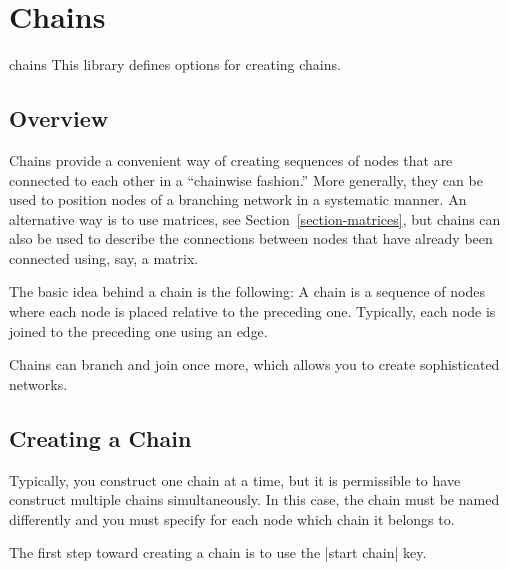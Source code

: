 %
%
%


\section{Chains}

\label{section-chains}

\begin{tikzlibrary}{chains}
  This library defines options for creating chains.
\end{tikzlibrary}


\subsection{Overview}

Chains provide a convenient way of creating sequences of nodes that
are connected to each other in a ``chainwise fashion.'' More
generally, they can be used to position nodes of a branching network
in a systematic manner. An alternative way is to use matrices, see
Section~\ref{section-matrices}, but chains can also be used 
to describe the connections between nodes that have already been
connected using, say, a matrix. 

The basic idea behind a chain is the following: A chain is a
sequence of nodes where each node is placed relative to the
preceding one. Typically, each node is joined to the preceding one
using an edge.

Chains can branch and join once more, which allows you to create
sophisticated networks.


\subsection{Creating a Chain}

Typically, you construct one chain at a time, but it is
permissible to have construct multiple chains simultaneously. In this
case, the chain must be named differently and you must specify for
each node which chain it belongs to.

The first step toward creating a chain is to use the |start chain|
key.

